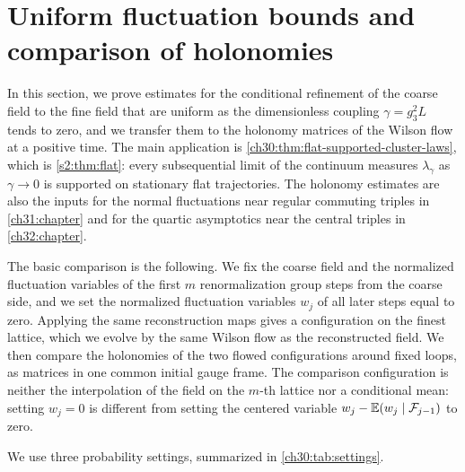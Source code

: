 \chapter{Uniform fluctuation bounds and comparison of holonomies}\label{ch30:chapter}

In this section, we prove estimates for the conditional refinement of the coarse field to the fine field that are uniform as the dimensionless coupling $\gamma=g_3^2L$ tends to zero, and we transfer them to the holonomy matrices of the Wilson flow at a positive time. The main application is \cref{ch30:thm:flat-supported-cluster-laws}, which is \cref{s2:thm:flat}: every subsequential limit of the continuum measures $\lambda_\gamma$ as $\gamma\to0$ is supported on stationary flat trajectories. The holonomy estimates are also the inputs for the normal fluctuations near regular commuting triples in \cref{ch31:chapter} and for the quartic asymptotics near the central triples in \cref{ch32:chapter}.

The basic comparison is the following. We fix the coarse field and the normalized fluctuation variables of the first $m$ renormalization group steps from the coarse side, and we set the normalized fluctuation variables $w_j$ of all later steps equal to zero. Applying the same reconstruction maps gives a configuration on the finest lattice, which we evolve by the same Wilson flow as the reconstructed field. We then compare the holonomies of the two flowed configurations around fixed loops, as matrices in one common initial gauge frame. The comparison configuration is neither the interpolation of the field on the $m$-th lattice nor a conditional mean: setting $w_j=0$ is different from setting the centered variable $w_j-\mathbb E(w_j\mid\mathcal F_{j-1})$ to zero.

We use three probability settings, summarized in \cref{ch30:tab:settings}.


